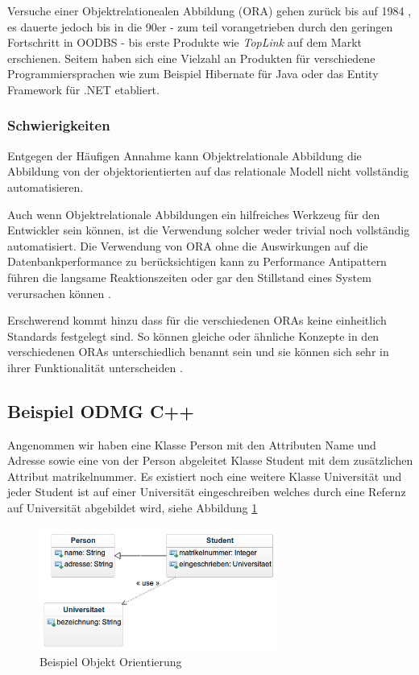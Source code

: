 Versuche einer Objektrelationealen Abbildung (ORA) gehen zurück bis auf 1984 \cite{ireland2009}, es dauerte jedoch bis in die 90er - zum teil vorangetrieben durch den geringen Fortschritt in OODBS - bis erste Produkte wie \emph{TopLink} auf dem Markt erschienen. Seitem haben sich eine Vielzahl an Produkten für verschiedene Programmiersprachen wie zum Beispiel Hibernate für Java oder das Entity Framework für .NET etabliert. 


\subsubsection{Schwierigkeiten}
Entgegen der Häufigen Annahme kann Objektrelationale Abbildung die Abbildung von der objektorientierten auf das relationale Modell nicht vollständig automatisieren. 

Auch wenn Objektrelationale Abbildungen ein hilfreiches Werkzeug für den Entwickler sein können, ist die Verwendung solcher weder trivial noch vollständig automatisiert. Die Verwendung von ORA ohne die Auswirkungen auf die Datenbankperformance zu berücksichtigen kann zu Performance Antipattern führen die langsame Reaktionszeiten oder gar den Stillstand eines System verursachen können \cite{chen2014}.

Erschwerend kommt hinzu dass für die verschiedenen ORAs keine einheitlich Standards festgelegt sind. So können gleiche oder ähnliche Konzepte in den verschiedenen ORAs unterschiedlich benannt sein und sie können sich sehr in ihrer Funktionalität unterscheiden \cite{torres2017}.


\subsection{Beispiel ODMG C++}
\label{oo-example-section}
Angenommen wir haben eine Klasse Person mit den Attributen Name und Adresse sowie eine von der Person abgeleitet Klasse Student mit dem zusätzlichen Attribut matrikelnummer. Es existiert noch eine weitere Klasse Universität und jeder Student ist auf einer Universität eingeschreiben welches durch eine Refernz auf Universität abgebildet wird, siehe Abbildung \ref{oo-example}

\begin{figure}[htp]
\centering
\includegraphics[width=0.7\textwidth]{images/OODBS-class-diagram.png}
\caption{Beispiel Objekt Orientierung}
\label{oo-example}
\end{figure}

